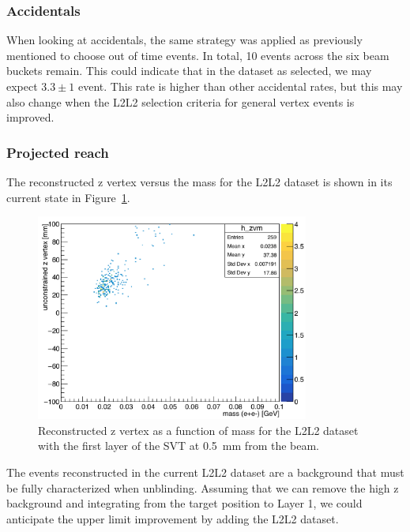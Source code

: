 \documentclass[twoside]{article}
\begin{document}
\subsubsection{Accidentals}

When looking at accidentals, the same strategy was applied as previously mentioned to choose out of time events. In total, 10 events across the six beam buckets remain. This could indicate that in the dataset as selected, we may expect $3.3\pm1$ event. This rate is higher than other accidental rates, but this may also change when the L2L2 selection criteria for general vertex events is improved.

\subsubsection{Projected reach}

The reconstructed z vertex versus the mass for the L2L2 dataset is shown in its current state in Figure~\ref{fig:zVm_L2L2_0p5}.

\begin{figure}[H]
  \centering
     \includegraphics[width=0.8\textwidth]{plots/zVm_L2L2.png}
  \caption{Reconstructed z vertex as a function of mass for the L2L2 dataset with the first layer of the SVT at 0.5~mm from the beam.}
  \label{fig:zVm_L2L2_0p5}
\end{figure} 

The events reconstructed in the current L2L2 dataset are a background that must be fully characterized when unblinding. Assuming that we can remove the high z background and integrating from the target position to Layer 1, we could anticipate the upper limit improvement by adding the L2L2 dataset. 
\end{document}
